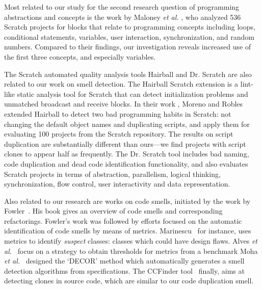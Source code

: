 \documentclass{sig-alternate}
\begin{document}
Most related to our study for the second research question of programming abstractions and concepts is the work by Maloney \emph{et al.} \cite{Maloney_2008}, who analyzed 536 Scratch projects for blocks that relate to programming concepts including loops, conditional statements, variables, user interaction, synchronization, and random numbers. Compared to their findings, our investigation reveals increased use of the first three concepts, and especially variables.

The Scratch automated quality analysis tools Hairball \cite{boe_hairball:_2013} and Dr. Scratch \cite{moreno-leon_dr._2015} are also related to our work on smell detection. The Hairball Scratch extension is a lint-like static analysis tool for Scratch that can detect initialization problems and unmatched broadcast and receive blocks. In their work \cite{moreno_automatic_2014}, Moreno and Robles extended Hairball to detect two bad programming habits in Scratch: not changing the default object names and duplicating scripts, and apply them for evaluating 100 projects from the Scratch repository. The results on script duplication are substantially different than ours---we find projects with script clones to appear half as frequently. The Dr. Scratch tool \cite{moreno-leon_dr._2015} includes bad naming, code duplication and dead code identification functionality, and also evaluates Scratch projects in terms of abstraction, parallelism, logical thinking, synchronization, flow control, user interactivity and data representation.

Also related to our research are works on code smells, initiated by the work by Fowler~\cite{fowler_refactoring:_1999}. His book gives an overview of code smells and corresponding refactorings. Fowler's work was followed by efforts focused on the automatic identification of code smells by means of metrics. Marinescu~\cite{marinescu_detecting_2001} for instance, uses metrics to identify \emph{suspect} classes: classes which could have design flaws. Alves \emph{et al.}~\cite{alves_deriving_2010} focus on a strategy to obtain thresholds for metrics from a benchmark Moha \emph{et al.}~\cite{moha_decor:_2010} designed the `DECOR' method which automatically generates a smell detection algorithms from specifications. The CCFinder tool~\cite{kamiya_ccfinder:_2002} finally, aims at detecting clones in source code, which are similar to our code duplication smell.
\end{document}
